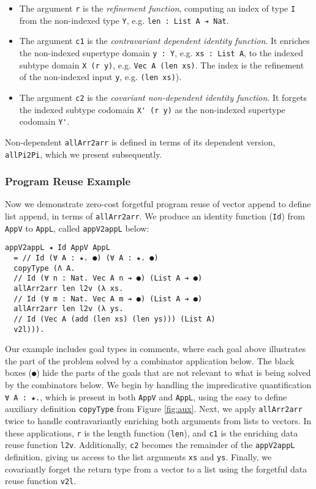 \documentclass[acmsmall,screen]{acmart}
\newcommand{\reffig}[1]{Figure \ref{fig:#1}}
\begin{document}
\begin{itemize}
\item The argument \verb;r;  is the
  \textit{refinement function}, computing an
  index of type \verb;I; from the
  non-indexed type \verb;Y;, e.g. \verb;len : List A ➔ Nat;.

\item The argument \verb;c1; is the
  \textit{contravariant dependent identity function}.
  It enriches the non-indexed supertype domain \verb;y : Y;,
  e.g. \verb;xs : List A;,
  to the indexed subtype domain \verb;X (r y);,
  e.g. \verb;Vec A (len xs);.
  The index is the refinement
  of the non-indexed input \verb;y;, e.g. \verb;(len xs);).

\item The argument \verb;c2; is the
  \textit{covariant non-dependent identity function}.
  It forgets the indexed subtype codomain \verb;X' (r y);
  as the non-indexed supertype codomain \verb;Y';.
\end{itemize}

Non-dependent \verb;allArr2arr; is defined in terms of its dependent
version, \verb;allPi2Pi;, which we present subsequently.

\subsubsection{Program Reuse Example}

Now we demonstrate zero-cost forgetful program reuse of vector append
to define list append, in terms of \verb;allArr2arr;. We produce
an identity function (\verb;Id;) from \verb;AppV; to \verb;AppL;,
called \verb;appV2appL; below:
\begin{verbatim}
appV2appL ◂ Id AppV AppL
  = // Id (∀ A : ★. ●) (∀ A : ★. ●)
  copyType (Λ A. 
  // Id (∀ n : Nat. Vec A n ➔ ●) (List A ➔ ●)
  allArr2arr len l2v (λ xs. 
  // Id (∀ m : Nat. Vec A m ➔ ●) (List A ➔ ●)
  allArr2arr len l2v (λ ys. 
  // Id (Vec A (add (len xs) (len ys))) (List A)
  v2l))).
\end{verbatim}
Our example includes goal types in comments, where each goal above
illustrates the part of the problem solved by a combinator
application below. The black boxes (\verb;●;) hide the parts of the
goals that are not relevant to what is being solved by the combinators
below. We begin by handling the impredicative quantification
\verb;∀ A : ★.;, which is present in both \verb;AppV; and \verb;AppL;,
using the easy to define auxiliary definition \verb;copyType; from
\reffig{aux}. Next, we apply \verb;allArr2arr; twice to handle
contravariantly enriching both arguments from lists to
vectors. In these applications, \verb;r; is the length function
(\verb;len;), and \verb;c1; is the enriching data reuse function
\verb;l2v;. Additionally, \verb;c2; becomes the remainder of the
\verb;appV2appL; definition, giving us access to the list arguments
\verb;xs; and \verb;ys;. Finally, we covariantly forget the return type from a
vector to a list using the forgetful data reuse function \verb;v2l;.
\end{document}
